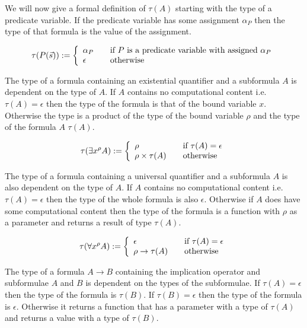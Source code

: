 We will now give a formal definition of $\tau (A)$ starting with the type of a
predicate variable. If the predicate variable has some assignment $\alpha_P$ then the type of that
formula is the value of the assignment.


\[
\tau(P(\vec{s})) := \left\{ 
\begin{array}{l l}
  \alpha_P & \quad \text{if $P$ is a predicate variable with assigned $\alpha_P$}\\
 \epsilon & \quad \text{otherwise}\\
\end{array} \right.
\]

The type of a formula containing an existential quantifier and a subformula
$A$ is dependent on the type of $A$. If $A$ contains no computational content
i.e. $\tau(A) = \epsilon$ then the type of the formula is that of the bound
variable $x$. Otherwise the type is a product of the type of the bound
variable $\rho$ and the type of the formula $A$ $\tau (A)$.

\[
\tau(\exists x^{\rho} A) := \left\{ 
\begin{array}{l l}
  \rho & \quad \text{if $\tau(A) = \epsilon$}\\
 \rho \times \tau (A) & \quad \text{otherwise}\\
\end{array} \right.
\]


The type of a formula containing a universal quantifier and a subformula $A$
is also dependent on the type of $A$. If $A$ contains no computational content
i.e. $\tau (A) = \epsilon$ then the type of the whole formula is also
$\epsilon$. Otherwise if $A$ does have some computational content then the type
of the formula is a function with $\rho$ as a parameter and returns a result
of type $\tau (A)$.


\[
\tau(\forall x^{\rho} A) := \left\{ 
\begin{array}{l l}
  \epsilon & \quad \text{if $\tau(A) = \epsilon$}\\
 \rho \to \tau (A) & \quad \text{otherwise}\\
\end{array} \right.
\]


The type of a formula $A \to B$ containing the implication operator and
subformulae $A$ and $B$ is dependent on the types of the subformulae.
If $\tau (A) = \epsilon$ then the type of the formula is $ \tau (B)$. If $\tau
(B) = \epsilon$ then the type of the formula is $\epsilon$. Otherwise it
returns a function that has a parameter with a type of $\tau (A)$ and returns a value with
a type of $\tau (B)$.

